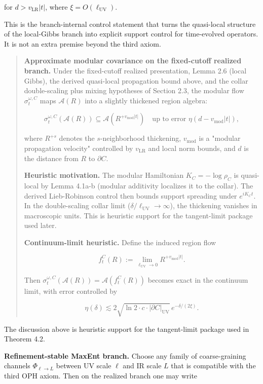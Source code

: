 for \(d > v_{\mathrm{LR}}|t|\), where \(\xi = O(\ell_{\mathrm{UV}})\).

This is the branch-internal control statement that turns the quasi-local structure of the
local-Gibbs branch into explicit support control for time-evolved operators. It is not an extra
premise beyond the third axiom.

\begin{quote}
\textbf{Approximate modular covariance on the fixed-cutoff realized branch.} Under the fixed-cutoff realized presentation, Lemma 2.6 (local Gibbs), the derived quasi-local propagation bound above, and the collar double-scaling plus mixing hypotheses of Section 2.3, the modular flow \(\sigma_t^{\omega,C}\) maps \(\mathcal{A}(R)\) into a slightly thickened region algebra:

\[
\sigma_t^{\omega,C}(\mathcal{A}(R)) \subseteq \mathcal{A}(R^{+v_{\mathrm{mod}}|t|})
\quad \text{up to error } \eta(d - v_{\mathrm{mod}}|t|),
\]

where \(R^{+s}\) denotes the \(s\)-neighborhood thickening, \(v_{\mathrm{mod}}\) is a "modular propagation velocity" controlled by \(v_{\mathrm{LR}}\) and local norm bounds, and \(d\) is the distance from \(R\) to \(\partial C\).

\textbf{Heuristic motivation.} The modular Hamiltonian \(K_C = -\log \rho_C\) is quasi-local by Lemma 4.1a-b (modular additivity localizes it to the collar). The derived Lieb-Robinson control then bounds support spreading under \(e^{iK_C t}\). In the double-scaling collar limit (\(\delta/\ell_{\mathrm{UV}} \to \infty\)), the thickening vanishes in macroscopic units. This is heuristic support for the tangent-limit package used later.

\textbf{Continuum-limit heuristic.} Define the induced region flow

\[
f_t^C(R) := \lim_{\ell_{\mathrm{UV}} \to 0} R^{+v_{\mathrm{mod}}|t|}.
\]

Then \(\sigma_t^{\omega,C}(\mathcal{A}(R)) = \mathcal{A}(f_t^C(R))\) becomes exact in the continuum limit, with error controlled by

\[
\eta(\delta) \lesssim 2\sqrt{\ln 2 \cdot c \cdot |\partial C|_{\mathrm{UV}}} \, e^{-\delta/(2\xi)}.
\]
\end{quote}

The discussion above is heuristic support for the tangent-limit package used in Theorem 4.2.

\textbf{Refinement-stable MaxEnt branch.} Choose any family of coarse-graining channels \(\Phi_{\ell\to L}\) between UV scale \(\ell\) and IR scale \(L\) that is compatible with the third OPH axiom. Then on the realized branch one may write

